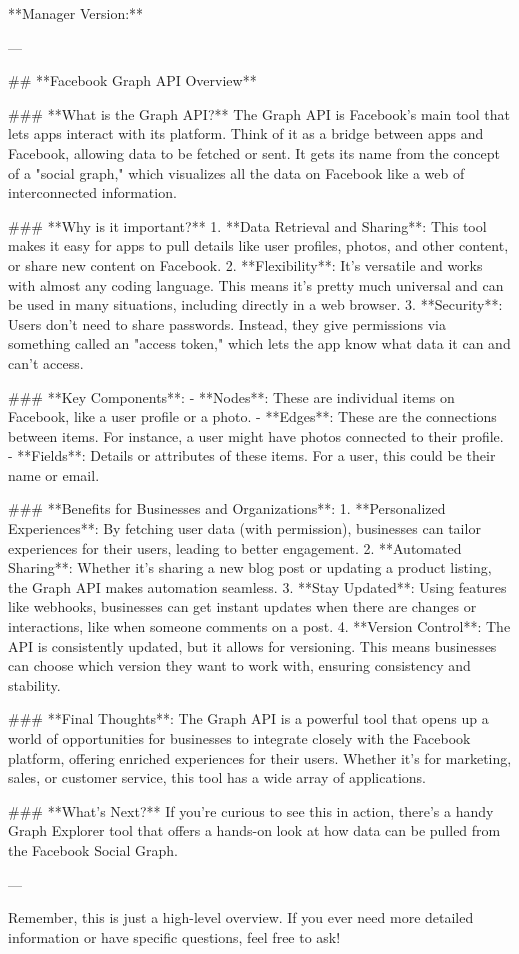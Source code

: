**Manager Version:**

---

## **Facebook Graph API Overview**

### **What is the Graph API?**
The Graph API is Facebook's main tool that lets apps interact with its platform. Think of it as a bridge between apps and Facebook, allowing data to be fetched or sent. It gets its name from the concept of a "social graph," which visualizes all the data on Facebook like a web of interconnected information.

### **Why is it important?**
1. **Data Retrieval and Sharing**: This tool makes it easy for apps to pull details like user profiles, photos, and other content, or share new content on Facebook.
2. **Flexibility**: It's versatile and works with almost any coding language. This means it's pretty much universal and can be used in many situations, including directly in a web browser.
3. **Security**: Users don’t need to share passwords. Instead, they give permissions via something called an "access token," which lets the app know what data it can and can't access.

### **Key Components**:
- **Nodes**: These are individual items on Facebook, like a user profile or a photo.
- **Edges**: These are the connections between items. For instance, a user might have photos connected to their profile.
- **Fields**: Details or attributes of these items. For a user, this could be their name or email.

### **Benefits for Businesses and Organizations**:
1. **Personalized Experiences**: By fetching user data (with permission), businesses can tailor experiences for their users, leading to better engagement.
2. **Automated Sharing**: Whether it's sharing a new blog post or updating a product listing, the Graph API makes automation seamless.
3. **Stay Updated**: Using features like webhooks, businesses can get instant updates when there are changes or interactions, like when someone comments on a post.
4. **Version Control**: The API is consistently updated, but it allows for versioning. This means businesses can choose which version they want to work with, ensuring consistency and stability.

### **Final Thoughts**:
The Graph API is a powerful tool that opens up a world of opportunities for businesses to integrate closely with the Facebook platform, offering enriched experiences for their users. Whether it's for marketing, sales, or customer service, this tool has a wide array of applications.

### **What's Next?**
If you're curious to see this in action, there's a handy Graph Explorer tool that offers a hands-on look at how data can be pulled from the Facebook Social Graph.

--- 

Remember, this is just a high-level overview. If you ever need more detailed information or have specific questions, feel free to ask!